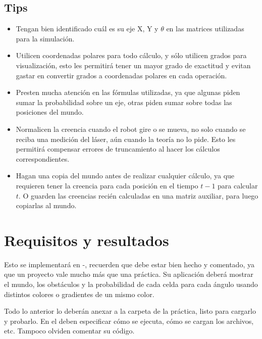\subsection{Tips}

\begin{itemize}
  \item Tengan bien identificado cuál es su eje X, Y y \(\theta\) en las matrices utilizadas para la simulación.

  \item Utilicen coordenadas polares para todo cálculo, y sólo utilicen grados para visualización, esto les permitirá tener un mayor grado de exactitud y evitan gastar en convertir grados a coordenadas polares en cada operación.

  \item Presten mucha atención en las fórmulas utilizadas, ya que algunas piden sumar la probabilidad sobre un eje, otras piden sumar sobre todas las posiciones del mundo.

  \item Normalicen la creencia cuando el robot gire o se mueva, no solo cuando se reciba una medición del láser, aún cuando la teoría no lo pide. Esto les permitirá compensar errores de truncamiento al hacer los cálculos correspondientes.

  \item Hagan una copia del mundo antes de realizar cualquier cálculo, ya que requieren tener la creencia para cada posición en el tiempo \(t-1\) para calcular \(t\). O guarden las creencias recién calculadas en una matriz auxiliar, para luego copiarlas al mundo.
\end{itemize}


\section{Requisitos y resultados}

Esto se implementará en \Java-, recuerden que debe estar bien hecho y comentado, ya que un proyecto vale mucho más que una práctica. Su aplicación deberá mostrar el mundo, los obstáculos y la probabilidad de cada celda para cada ángulo usando distintos colores o gradientes de un mismo color.

Todo lo anterior lo deberán anexar a la carpeta de la práctica, listo para cargarlo y probarlo. En el  deben especificar cómo se ejecuta, cómo se cargan los archivos, etc. Tampoco olviden comentar su código.
